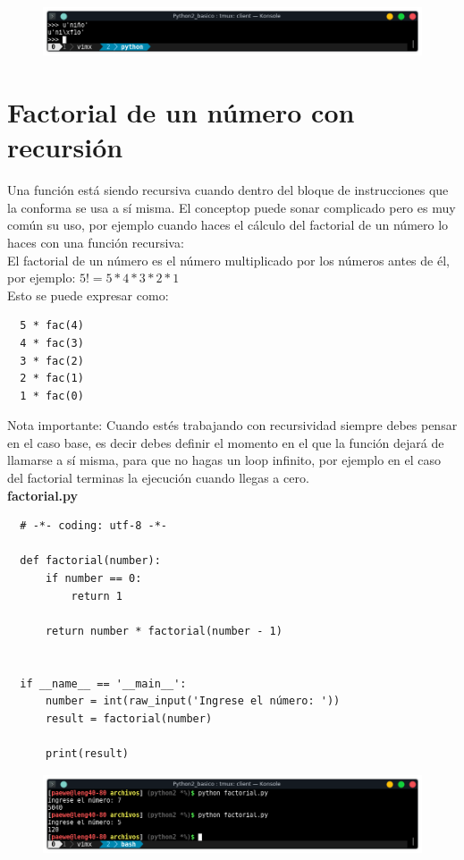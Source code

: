 \documentclass{article}
\begin{document}
\newpage

\begin{figure}[h!]
  \centering
  \includegraphics[scale=0.75]{./Pictures/003_unicode_python2.png}
\end{figure}


\section{Factorial de un número con recursión}%
Una función está siendo recursiva cuando dentro del bloque de instrucciones que
la conforma se usa a sí misma. El conceptop puede sonar complicado pero es muy
común su uso, por ejemplo cuando haces el cálculo del factorial de un número lo
haces con una función recursiva:\\

El factorial de un número es el número multiplicado por los números antes de
él, por ejemplo: $5! = 5*4*3*2*1$\\

Esto se puede expresar como:

\begin{verbatim}
  5 * fac(4)
  4 * fac(3)
  3 * fac(2)
  2 * fac(1)
  1 * fac(0)
\end{verbatim}

Nota importante: Cuando estés trabajando con recursividad siempre debes pensar
en el caso base, es decir debes definir el momento en el que la función dejará
de llamarse a sí misma, para que no hagas un loop infinito, por ejemplo en el
caso del factorial terminas la ejecución cuando llegas a cero.\\

\textbf{factorial.py}
\begin{verbatim}
  # -*- coding: utf-8 -*-

  def factorial(number):
      if number == 0:
          return 1

      return number * factorial(number - 1)


  if __name__ == '__main__':
      number = int(raw_input('Ingrese el número: '))
      result = factorial(number)

      print(result)
\end{verbatim}

\begin{figure}[h!]
  \centering
  \includegraphics[scale=0.75]{./Pictures/029_factorial.png}
\end{figure}
\end{document}
